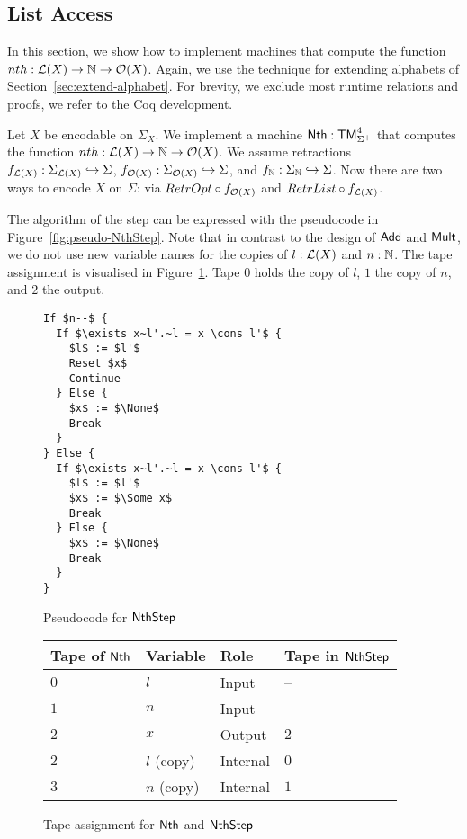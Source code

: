 \subsection{List Access}
\label{sec:Nth}

In this section, we show how to implement machines that compute the function $nth : \mathcal{L}(X) \rightarrow \mathbb{N} \rightarrow \mathcal{O}(X)$.  Again, we use the technique
for extending alphabets of Section~\ref{sec:extend-alphabet}.  For brevity, we exclude most runtime relations and proofs, we refer to the Coq
development.

Let $X$ be encodable on $\Sigma_X$.  We implement a machine $\mathsf{Nth} : \mathsf{TM}_{\Sigma^+}^4$ that computes the function
$nth : \mathcal{L}(X) \rightarrow \mathbb{N} \rightarrow \mathcal{O}(X)$.  We assume retractions $f_{\mathcal{L}(X)} : \Sigma_{\mathcal{L}(X)} \hookrightarrow \Sigma$,
$f_{\mathcal{O}(X)} : \Sigma_{\mathcal{O}(X)} \hookrightarrow \Sigma$, and $f_{\mathbb{N}} : \Sigma_{\mathbb{N}} \hookrightarrow \Sigma$.  Now there are two ways to encode
$X$ on $\Sigma$: via $RetrOpt \circ f_{\mathcal{O}(X)}$ and $RetrList \circ f_{\mathcal{L}(X)}$.

The algorithm of the step can be expressed with the pseudocode in Figure~\ref{fig:pseudo-NthStep}.  Note that in contrast to the design of $\mathsf{Add}$
and $\mathsf{Mult}$, we do not use new variable names for the copies of $l:\mathcal{L}(X)$ and $n:\mathbb{N}$.  The tape assignment is visualised in
Figure~\ref{fig:tapes-Nth}.  Tape $0$ holds the copy of $l$, $1$ the copy of $n$, and $2$ the output.

\begin{figure}[!htb]
  \begin{minipage}{0.3\textwidth}
    \small
\begin{lstlisting}[style=pseudocode]
If $n--$ {
  If $\exists x~l'.~l = x \cons l'$ {
    $l$ := $l'$
    Reset $x$
    Continue
  } Else {
    $x$ := $\None$
    Break
  }
} Else {
  If $\exists x~l'.~l = x \cons l'$ {
    $l$ := $l'$
    $x$ := $\Some x$
    Break
  } Else {
    $x$ := $\None$
    Break
  }
}
\end{lstlisting}
    \caption{Pseudocode for $\mathsf{NthStep}$}
    \label{fig:pseudo-NthStep}
  \end{minipage}%
  \begin{minipage}{0.7\textwidth}
    \begin{tabular}{l|l|l|l}
      Tape of $\mathsf{Nth}$ & Variable & Role & Tape in $\mathsf{NthStep}$ \\ \hline
      $0$ & $l$        & Input    & --  \\
      $1$ & $n$        & Input    & --  \\
      $2$ & $x$        & Output   & $2$ \\
      $2$ & $l$ (copy) & Internal & $0$ \\
      $3$ & $n$ (copy) & Internal & $1$ \\
    \end{tabular}
    \caption{Tape assignment for $\mathsf{Nth}$ and $\mathsf{NthStep}$}
    \label{fig:tapes-Nth}
  \end{minipage}
\end{figure}


